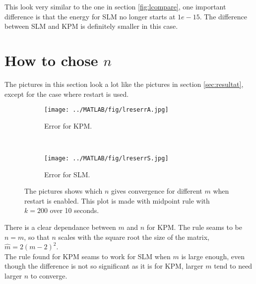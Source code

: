 This look very similar to the one in section \ref{fig:lcompare}, one important difference is that the energy for SLM no longer starts at $1e-15$. The difference between SLM and KPM is definitely smaller in this case.

\section{How to chose $n$}
The pictures in this section look a lot like the pictures in section \ref{sec:resultat}, except for the case where restart is used.
\begin{figure}[H]
        \centering
        \begin{subfigure}[b]{0.45\textwidth}
                \texttt{[image: ../MATLAB/fig/lreserrA.jpg]}
                \caption{ Error for KPM. }
                \label{fig:lreserrS}
        \end{subfigure}
		~
		\begin{subfigure}[b]{0.45\textwidth}
                \texttt{[image: ../MATLAB/fig/lreserrS.jpg]}
                \caption{ Error for SLM. }
                \label{fig:lreseneA}
        \end{subfigure}
        \caption{ The pictures shows which $n$ gives convergence for different $m$ when restart is enabled. This plot is made with midpoint rule with $k = 200$ over 10 seconds. }
        \label{fig:tres}

\end{figure}
There is a clear dependance between $m$ and $n$ for KPM. The rule seams to be $n = m$, so that $n$ scales with the square root the size of the matrix, $\hat{m} = 2(m-2)^2$. \\ 
The rule found for KPM seams to work for SLM when $m$ is large enough, even though the difference is not so significant as it is for KPM, larger $m$ tend to need larger $n$ to converge.

